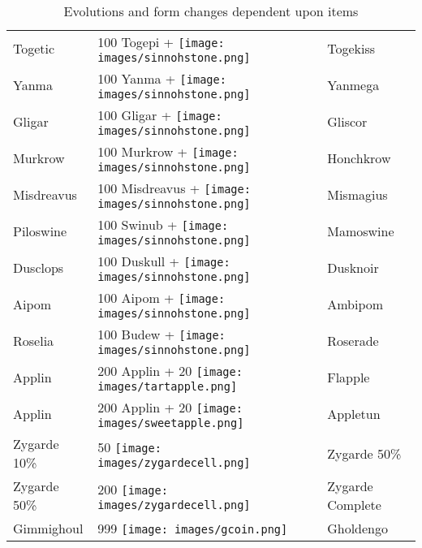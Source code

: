 \begin{table}
\begin{tabular}{lll}
    Togetic & 100 Togepi + \texttt{[image: images/sinnohstone.png]} & Togekiss	\\
    Yanma & 100 Yanma + \texttt{[image: images/sinnohstone.png]} & Yanmega	\\
    Gligar & 100 Gligar + \texttt{[image: images/sinnohstone.png]} & Gliscor	\\
    Murkrow & 100 Murkrow + \texttt{[image: images/sinnohstone.png]} & Honchkrow	\\
    Misdreavus & 100 Misdreavus + \texttt{[image: images/sinnohstone.png]} & Mismagius	\\
    Piloswine & 100 Swinub + \texttt{[image: images/sinnohstone.png]} & Mamoswine	\\
    Dusclops & 100 Duskull + \texttt{[image: images/sinnohstone.png]} & Dusknoir	\\
    Aipom & 100 Aipom + \texttt{[image: images/sinnohstone.png]} & Ambipom	\\
    Roselia & 100 Budew + \texttt{[image: images/sinnohstone.png]} & Roserade	\\
    Applin & 200 Applin + 20 \texttt{[image: images/tartapple.png]} & Flapple \\
    Applin & 200 Applin + 20 \texttt{[image: images/sweetapple.png]} & Appletun \\
    Zygarde 10\% & 50 \texttt{[image: images/zygardecell.png]} & Zygarde 50\% \\
    Zygarde 50\% & 200 \texttt{[image: images/zygardecell.png]} & Zygarde Complete \\
    Gimmighoul & 999 \texttt{[image: images/gcoin.png]} & Gholdengo \\
  \end{tabular}
  \caption{Evolutions and form changes dependent upon items\label{table:itemevolutions}}
\end{table}

